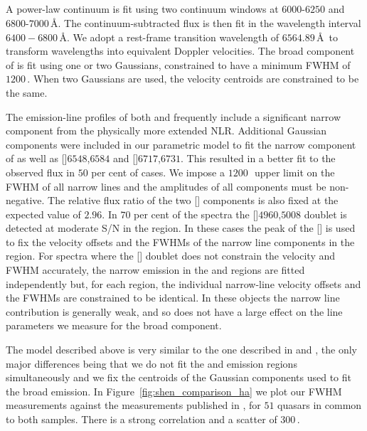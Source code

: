 \subsection{\ha}
\label{sec:ha}

A power-law continuum is fit using two continuum windows at $6000$-$6250$ and $6800$-$7000$\,\AA. 
The continuum-subtracted flux is then fit in the wavelength interval $6400-6800$\,\AA. 
We adopt a rest-frame transition wavelength of $6564.89$\,\AA\, to transform wavelengths into equivalent Doppler velocities. 
The broad component of \ha is fit using one or two Gaussians, constrained to have a minimum FWHM of $1200$\,\kms. When two Gaussians are used, the velocity centroids are constrained to be the same.

The emission-line profiles of both \hb and \ha frequently include a significant narrow component from the physically more extended NLR. 
Additional Gaussian components were included in our parametric model to fit the narrow component of \ha as well as []\ll$6548$,$6584$ and []\ll$6717$,$6731$.
This resulted in a better fit to the observed flux in $50$ per cent of cases. 
We impose a $1200$\,\kms\, upper limit on the FWHM of all narrow lines and the amplitudes of all components must be non-negative.
The relative flux ratio of the two [] components is also fixed at the expected value of $2.96$.
In $70$ per cent of the spectra the []\ll$4960$,$5008$ doublet is detected at moderate S/N in the \hb region. 
In these cases the peak of the [] is used to fix the velocity offsets and the FWHMs of the narrow line components in the \ha region.  
For spectra where the [] doublet does not constrain the velocity and FWHM accurately, the narrow emission in the \ha and \hb regions are fitted independently but, for each region, the individual narrow-line velocity offsets and the FWHMs are constrained to be identical. 
In these objects the narrow line contribution is generally weak, and so does not have a large effect on the line parameters we measure for the broad component.   

The model described above is very similar to the one described in \citet{shen12} and \citet{shen11}, the only major differences being that we do not fit the \ha and \hb emission regions simultaneously and we fix the centroids of the Gaussian components used to fit the broad emission.
In Figure~\ref{fig:shen_comparison_ha} we plot our \ha FWHM measurements against the measurements published in \citet{shen12}, for $51$ quasars in common to both samples.
There is a strong correlation and a scatter of $300$\,\kms. 


